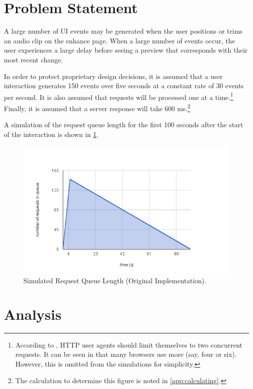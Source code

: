 \documentclass[se,resubmit]{uw-wkrpt}
\begin{document}
\section{Problem Statement}\label{sec:problem}
A large number of UI events may be generated when the user positions or trims an
audio clip on the enhance page. When a large number of events occur, the user
experiences a large delay before seeing a preview that corresponds with their
most recent change.

In order to protect proprietary design decisions, it is assumed that a user
interaction generates 150 events over five seconds at a constant rate of 30
events per second. It is also assumed that requests will be processed one at a
time.\footnote{According to \cite{ref:http}, HTTP user agents should limit
themselves to two concurrent requests. It can be seen in \cite{ref:b423377} that
many browsers use more (say, four or six). However, this is omitted from the
simulations for simplicity.} Finally, it is assumed that a server response will
take 600 ms.\footnote{The calculation to determine this figure is noted in
\ref{app:calculating}.}

A simulation of the request queue length for the first 100 seconds after the
start of the interaction is shown in \ref{fig:sim-orig}.

\begin{figure}
  \centering
  \includegraphics{sim-orig}
  \caption{Simulated Request Queue Length (Original Implementation).}
  \label{fig:sim-orig}
\end{figure}

\section{Analysis}
\end{document}
